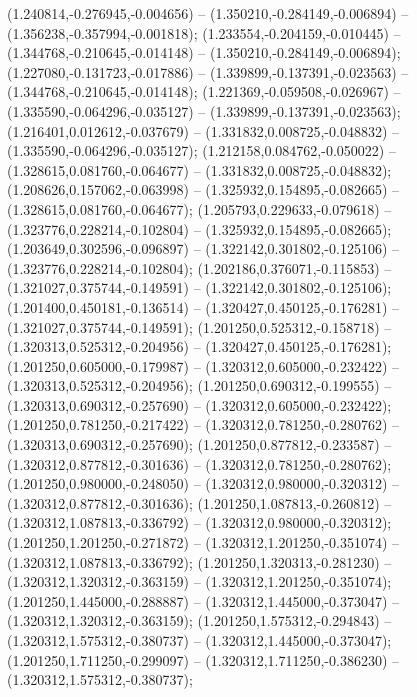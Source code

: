  (1.240814,-0.276945,-0.004656) -- (1.350210,-0.284149,-0.006894) -- (1.356238,-0.357994,-0.001818);
 (1.233554,-0.204159,-0.010445) -- (1.344768,-0.210645,-0.014148) -- (1.350210,-0.284149,-0.006894);
 (1.227080,-0.131723,-0.017886) -- (1.339899,-0.137391,-0.023563) -- (1.344768,-0.210645,-0.014148);
 (1.221369,-0.059508,-0.026967) -- (1.335590,-0.064296,-0.035127) -- (1.339899,-0.137391,-0.023563);
 (1.216401,0.012612,-0.037679) -- (1.331832,0.008725,-0.048832) -- (1.335590,-0.064296,-0.035127);
 (1.212158,0.084762,-0.050022) -- (1.328615,0.081760,-0.064677) -- (1.331832,0.008725,-0.048832);
 (1.208626,0.157062,-0.063998) -- (1.325932,0.154895,-0.082665) -- (1.328615,0.081760,-0.064677);
 (1.205793,0.229633,-0.079618) -- (1.323776,0.228214,-0.102804) -- (1.325932,0.154895,-0.082665);
 (1.203649,0.302596,-0.096897) -- (1.322142,0.301802,-0.125106) -- (1.323776,0.228214,-0.102804);
 (1.202186,0.376071,-0.115853) -- (1.321027,0.375744,-0.149591) -- (1.322142,0.301802,-0.125106);
 (1.201400,0.450181,-0.136514) -- (1.320427,0.450125,-0.176281) -- (1.321027,0.375744,-0.149591);
 (1.201250,0.525312,-0.158718) -- (1.320313,0.525312,-0.204956) -- (1.320427,0.450125,-0.176281);
 (1.201250,0.605000,-0.179987) -- (1.320312,0.605000,-0.232422) -- (1.320313,0.525312,-0.204956);
 (1.201250,0.690312,-0.199555) -- (1.320313,0.690312,-0.257690) -- (1.320312,0.605000,-0.232422);
 (1.201250,0.781250,-0.217422) -- (1.320312,0.781250,-0.280762) -- (1.320313,0.690312,-0.257690);
 (1.201250,0.877812,-0.233587) -- (1.320312,0.877812,-0.301636) -- (1.320312,0.781250,-0.280762);
 (1.201250,0.980000,-0.248050) -- (1.320312,0.980000,-0.320312) -- (1.320312,0.877812,-0.301636);
 (1.201250,1.087813,-0.260812) -- (1.320312,1.087813,-0.336792) -- (1.320312,0.980000,-0.320312);
 (1.201250,1.201250,-0.271872) -- (1.320312,1.201250,-0.351074) -- (1.320312,1.087813,-0.336792);
 (1.201250,1.320313,-0.281230) -- (1.320312,1.320312,-0.363159) -- (1.320312,1.201250,-0.351074);
 (1.201250,1.445000,-0.288887) -- (1.320312,1.445000,-0.373047) -- (1.320312,1.320312,-0.363159);
 (1.201250,1.575312,-0.294843) -- (1.320312,1.575312,-0.380737) -- (1.320312,1.445000,-0.373047);
 (1.201250,1.711250,-0.299097) -- (1.320312,1.711250,-0.386230) -- (1.320312,1.575312,-0.380737);
